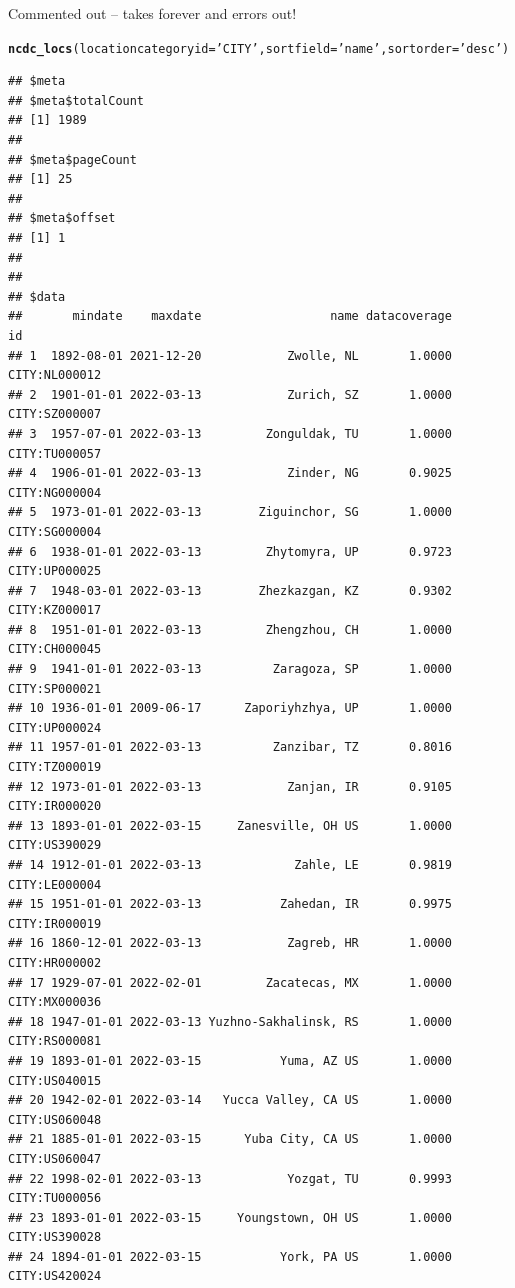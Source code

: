 \documentclass{article}\usepackage[]{graphicx}\usepackage[]{color}
\makeatletter
\newcommand{\hlstr}[1]{\textcolor[rgb]{0.192,0.494,0.8}{#1}}%
\newcommand{\hlstd}[1]{\textcolor[rgb]{0.345,0.345,0.345}{#1}}%
\newcommand{\hlkwc}[1]{\textcolor[rgb]{0.333,0.667,0.333}{#1}}%
\newcommand{\hlkwd}[1]{\textcolor[rgb]{0.737,0.353,0.396}{\textbf{#1}}}%
\newenvironment{kframe}{%
 \def\at@end@of@kframe{}%
 \ifinner\ifhmode%
  \def\at@end@of@kframe{\end{minipage}}%
  \begin{minipage}{\columnwidth}%
 \fi\fi%
 \def\FrameCommand##1{\hskip\@totalleftmargin \hskip-\fboxsep
 \colorbox{shadecolor}{##1}\hskip-\fboxsep
     \hskip-\linewidth \hskip-\@totalleftmargin \hskip\columnwidth}%
 \MakeFramed {\advance\hsize-\width
   \@totalleftmargin\z@ \linewidth\hsize
   \@setminipage}}%
 {\par\unskip\endMakeFramed%
 \at@end@of@kframe}
\newenvironment{knitrout}{}{} %
\makeatother
\begin{document}
Commented out -- takes forever and errors out!
\begin{knitrout}
\color{fgcolor}\begin{kframe}
\begin{alltt}
\hlkwd{ncdc_locs}\hlstd{(}\hlkwc{locationcategoryid}\hlstd{=}\hlstr{'CITY'}\hlstd{,} \hlkwc{sortfield}\hlstd{=}\hlstr{'name'}\hlstd{,} \hlkwc{sortorder}\hlstd{=}\hlstr{'desc'}\hlstd{)}
\end{alltt}
\begin{verbatim}
## $meta
## $meta$totalCount
## [1] 1989
## 
## $meta$pageCount
## [1] 25
## 
## $meta$offset
## [1] 1
## 
## 
## $data
##       mindate    maxdate                  name datacoverage            id
## 1  1892-08-01 2021-12-20            Zwolle, NL       1.0000 CITY:NL000012
## 2  1901-01-01 2022-03-13            Zurich, SZ       1.0000 CITY:SZ000007
## 3  1957-07-01 2022-03-13         Zonguldak, TU       1.0000 CITY:TU000057
## 4  1906-01-01 2022-03-13            Zinder, NG       0.9025 CITY:NG000004
## 5  1973-01-01 2022-03-13        Ziguinchor, SG       1.0000 CITY:SG000004
## 6  1938-01-01 2022-03-13         Zhytomyra, UP       0.9723 CITY:UP000025
## 7  1948-03-01 2022-03-13        Zhezkazgan, KZ       0.9302 CITY:KZ000017
## 8  1951-01-01 2022-03-13         Zhengzhou, CH       1.0000 CITY:CH000045
## 9  1941-01-01 2022-03-13          Zaragoza, SP       1.0000 CITY:SP000021
## 10 1936-01-01 2009-06-17      Zaporiyhzhya, UP       1.0000 CITY:UP000024
## 11 1957-01-01 2022-03-13          Zanzibar, TZ       0.8016 CITY:TZ000019
## 12 1973-01-01 2022-03-13            Zanjan, IR       0.9105 CITY:IR000020
## 13 1893-01-01 2022-03-15     Zanesville, OH US       1.0000 CITY:US390029
## 14 1912-01-01 2022-03-13             Zahle, LE       0.9819 CITY:LE000004
## 15 1951-01-01 2022-03-13           Zahedan, IR       0.9975 CITY:IR000019
## 16 1860-12-01 2022-03-13            Zagreb, HR       1.0000 CITY:HR000002
## 17 1929-07-01 2022-02-01         Zacatecas, MX       1.0000 CITY:MX000036
## 18 1947-01-01 2022-03-13 Yuzhno-Sakhalinsk, RS       1.0000 CITY:RS000081
## 19 1893-01-01 2022-03-15           Yuma, AZ US       1.0000 CITY:US040015
## 20 1942-02-01 2022-03-14   Yucca Valley, CA US       1.0000 CITY:US060048
## 21 1885-01-01 2022-03-15      Yuba City, CA US       1.0000 CITY:US060047
## 22 1998-02-01 2022-03-13            Yozgat, TU       0.9993 CITY:TU000056
## 23 1893-01-01 2022-03-15     Youngstown, OH US       1.0000 CITY:US390028
## 24 1894-01-01 2022-03-15           York, PA US       1.0000 CITY:US420024

\end{verbatim}
\end{kframe}
\end{knitrout}
\end{document}
